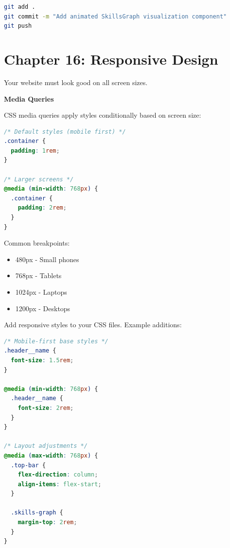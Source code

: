 \documentclass[12pt,a4paper]{article}
\begin{document}
\begin{gitcommit}
\begin{lstlisting}[language=bash]
git add .
git commit -m "Add animated SkillsGraph visualization component"
git push
\end{lstlisting}
\end{gitcommit}

\section{Chapter 16: Responsive Design}

Your website must look good on all screen sizes.

\begin{concept}
\textbf{Media Queries}

CSS media queries apply styles conditionally based on screen size:
\begin{lstlisting}[language=CSS]
/* Default styles (mobile first) */
.container {
  padding: 1rem;
}

/* Larger screens */
@media (min-width: 768px) {
  .container {
    padding: 2rem;
  }
}
\end{lstlisting}

Common breakpoints:
\begin{itemize}
    \item 480px - Small phones
    \item 768px - Tablets
    \item 1024px - Laptops
    \item 1200px - Desktops
\end{itemize}
\end{concept}

Add responsive styles to your CSS files. Example additions:

\begin{lstlisting}[language=CSS,caption={Responsive additions}]
/* Mobile-first base styles */
.header__name {
  font-size: 1.5rem;
}

@media (min-width: 768px) {
  .header__name {
    font-size: 2rem;
  }
}

/* Layout adjustments */
@media (max-width: 768px) {
  .top-bar {
    flex-direction: column;
    align-items: flex-start;
  }

  .skills-graph {
    margin-top: 2rem;
  }
}
\end{lstlisting}
\end{document}
